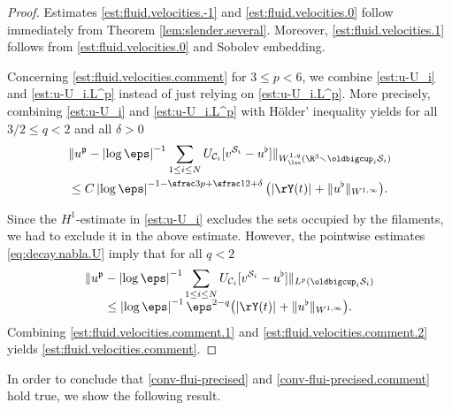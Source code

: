\begin{proof}
Estimates \eqref{est:fluid.velocities.-1} and \eqref{est:fluid.velocities.0} follow immediately from Theorem \ref{lem:slender.several}. Moreover, \eqref{est:fluid.velocities.1} follows from \eqref{est:fluid.velocities.0} and Sobolev embedding.

Concerning \eqref{est:fluid.velocities.comment} for $3 \leq p < 6$,
we combine \eqref{est:u-U_i} and \eqref{est:u-U_i.L^p} instead of just relying on \eqref{est:u-U_i.L^p}.
More precisely, combining \eqref{est:u-U_i} and \eqref{est:u-U_i.L^p} with Hölder' inequality yields for all $3/2 \leq q < 2$ and all $\delta > 0$
\begin{align} \label{est:fluid.velocities.comment.1}
&\|u^\mathfrak{p} - \left|\log \eps\right|^{-1} \sum_{1 \leq i \leq N} U_{\mathcal C_i}[v^{{\mathcal S}_i} - u^\flat]\|_{W^{1,q}_{\loc}(\R^3 \smallsetminus \oldbigcup_i \mathcal S_i)}\\
&\leq C \left|\log \eps\right|^{-1 - \sfrac 3 p + \sfrac 1 2 + \delta} \big(|\rY(t)|_{} + \|u^\flat\|_{W^{1,\infty}} \big).
\end{align}

Since the $H^1$-estimate in \eqref{est:u-U_i} excludes the sets occupied by the filaments, we had to exclude it in the above estimate. However, the pointwise estimates \eqref{eq:decay.nabla.U}
imply that for all $q < 2$\vspace*{-3pt}
\begin{multline} \label{est:fluid.velocities.comment.2}
\|u^\mathfrak{p} - \left|\log \eps\right|^{-1} \sum_{1 \leq i \leq N} U_{\mathcal C_i}[v^{{\mathcal S}_i} - u^\flat]\|_{L^p(\oldbigcup_i \mathcal S_i)}\\[-5pt]
\leq \left|\log \eps\right|^{-1} \eps^{2-q} \big(|\rY(t)|_{} + \|u^\flat\|_{W^{1,\infty}} \big).
\end{multline}
Combining \eqref{est:fluid.velocities.comment.1} and \eqref{est:fluid.velocities.comment.2} yields \eqref{est:fluid.velocities.comment}.
\end{proof}
In order to conclude that \eqref{conv-flui-precised} and \eqref{conv-flui-precised.comment} hold true, we show the following result.
